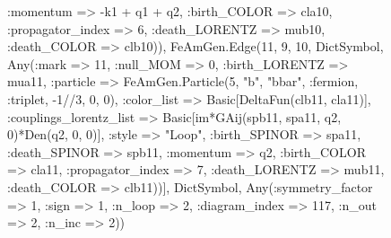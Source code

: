 \documentclass{revtex4}
\begin{document}
\begin{figure}[!htb]
\begin{center}
{:momentum => -k1 + q1 + q2, :birth_COLOR => cla10, :propagator_index => 6, :death_LORENTZ => mub10, :death_COLOR => clb10)), FeAmGen.Edge(11, 9, 10, Dict{Symbol, Any}(:mark => 11, :null_MOM => 0, :birth_LORENTZ => mua11, :particle => FeAmGen.Particle(5, "b", "bbar", :fermion, :triplet, -1//3, 0, 0), :color_list => Basic[DeltaFun(clb11, cla11)], :couplings_lorentz_list => Basic[im*GAij(spb11, spa11, q2, 0)*Den(q2, 0, 0)], :style => "Loop", :birth_SPINOR => spa11, :death_SPINOR => spb11, :momentum => q2, :birth_COLOR => cla11, :propagator_index => 7, :death_LORENTZ => mub11, :death_COLOR => clb11))], Dict{Symbol, Any}(:symmetry_factor => 1, :sign => 1, :n_loop => 2, :diagram_index => 117, :n_out => 2, :n_inc => 2)) 
}
\end{center}
\end{figure}
\end{document}
